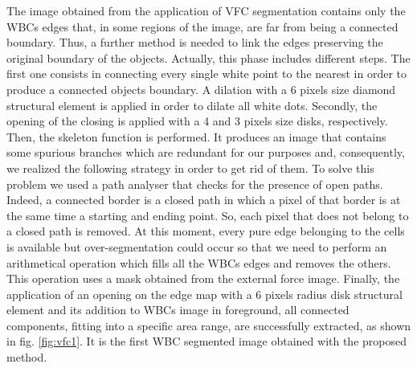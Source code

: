 \documentclass[final,a4paper,12pt,english]{UnicaPhdThesis3}
\begin{document}
	The image obtained from the application of VFC segmentation contains only the WBCs edges that, in some regions of the image, are far from being a connected boundary. Thus, a further method is needed to link the edges preserving the original boundary of the objects. Actually, this phase includes different steps. The first one consists in connecting every single white point to the nearest in order to produce a connected objects boundary. A dilation with a 6 pixels size diamond structural element is applied in order to dilate all white dots. Secondly, the opening of the closing is applied with a 4 and 3 pixels size disks, respectively. Then, the skeleton function is performed. It produces an image that contains some spurious branches which are redundant for our purposes and, consequently, we realized the following strategy in order to get rid of them. 
	To solve this problem we used a path analyser that checks for the presence of open paths. Indeed, a connected border is a closed path in which a pixel of that border is at the same time a starting and ending point. So, each pixel that does not belong to a closed path is removed.
	At this moment, every pure edge belonging to the cells is available but over-segmentation could occur so that we need to perform an arithmetical operation which fills all the WBCs edges and removes the others. This operation uses a mask obtained from the external force image.
	Finally, the application of an opening on the edge map with a 6 pixels radius disk structural element and its addition to WBCs image in foreground, all connected components, fitting into a specific area range, are successfully extracted, as shown in fig. \ref{fig:vfc1}. It is the first WBC segmented image obtained with the proposed method.
	
\end{document}
